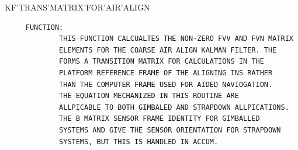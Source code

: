 \begin{frame}
KF'TRANS'MATRIX'FOR'AIR'ALIGN
\begin{verbatim}
     FUNCTION:
             THIS FUNCTION CALCUALTES THE NON-ZERO FVV AND FVN MATRIX
             ELEMENTS FOR THE COARSE AIR ALIGN KALMAN FILTER. THE
             FORMS A TRANSITION MATRIX FOR CALCULATIONS IN THE
             PLATFORM REFERENCE FRAME OF THE ALIGNING INS RATHER
             THAN THE COMPUTER FRAME USED FOR AIDED NAVIOGATION.
             THE EQUATION MECHANIZED IN THIS ROUTINE ARE
             ALLPICABLE TO BOTH GIMBALED AND STRAPDOWN ALLPICATIONS.
             THE B MATRIX SENSOR FRAME IDENTITY FOR GIMBALLED
             SYSTEMS AND GIVE THE SENSOR ORIENTATION FOR STRAPDOWN
             SYSTEMS, BUT THIS IS HANDLED IN ACCUM.

\end{verbatim}
\end{frame}
